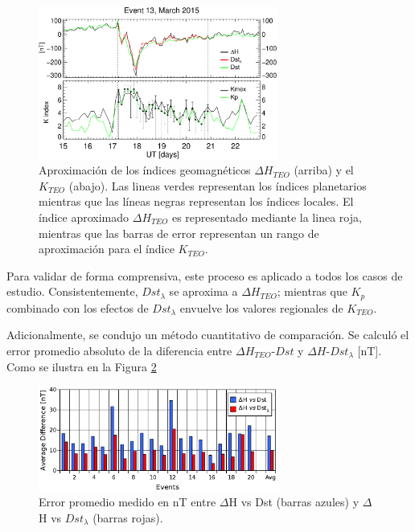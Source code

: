 \begin{figure}
\centering
    \includegraphics[width=0.7\textwidth]{Images/diono_valid_V4_2015-03-15.eps}
    \caption{Aproximación de los índices geomagnéticos  $\Delta H_{TEO}$ (arriba) y el $K_{TEO}$ (abajo). Las lineas verdes representan los índices planetarios mientras que las líneas negras representan los índices locales. El índice aproximado $\Delta H_{TEO}$ es representado mediante la linea roja, mientras que las barras de error representan un rango de aproximación para el índice $K_{TEO}$.}
    \label{fig:iono_valid}
\end{figure}

Para  validar de forma comprensiva, este proceso es aplicado a todos los casos de estudio. Consistentemente, $ Dst_\lambda$ se aproxima a $\Delta H_{TEO}$; mientras que $K_p$ combinado con los efectos de $Dst_\lambda$ envuelve los valores regionales de $K_{TEO}$.
\vspace{1 em}

Adicionalmente, se condujo un método cuantitativo de comparación. Se calculó el error promedio absoluto de la diferencia entre $\Delta H_{TEO}$-$Dst$ y $\Delta H$-$Dst_\lambda$ [nT]. Como se ilustra en la Figura \ref{fig:valid}

\begin{figure}
\centering
    \includegraphics[width=0.7\textwidth]{Images/prom_dist.eps}
    \caption{Error promedio medido en nT entre $\Delta$H vs Dst (barras azules) y $\Delta$H vs $Dst_\lambda$ (barras rojas).}
    \label{fig:valid}
\end{figure}

